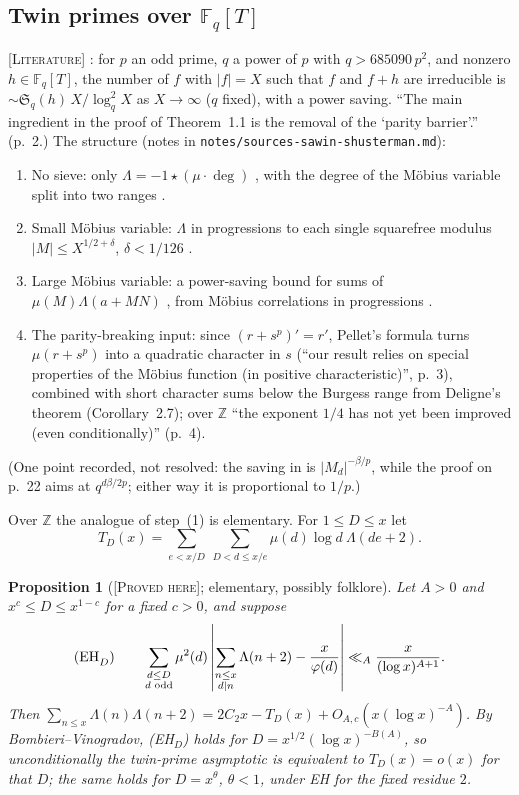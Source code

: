 \documentclass[11pt]{amsart}
\newtheorem{proposition}[theorem]{Proposition}
\theoremstyle{definition}
\theoremstyle{remark}
\newcommand{\lbl}[1]{\textup{\textsc{[#1]}}}
\begin{document}
\subsection{Twin primes over \texorpdfstring{$\mathbb F_q[T]$}{Fq[T]}}\label{sec:ss}
\lbl{Literature} \cite[Theorem~1.1, p.~2; Theorem~6.3, p.~30]{SS19}: for $p$ an
odd prime, $q$ a power of $p$ with $q>685090\,p^2$, and nonzero
$h\in\mathbb F_q[T]$, the number of $f$ with $|f|=X$ such that $f$ and $f+h$ are
irreducible is $\sim\mathfrak S_q(h)\,X/\log_q^2X$ as $X\to\infty$ ($q$ fixed),
with a power saving. ``The main ingredient in the proof of Theorem~1.1 is the
removal of the `parity barrier'.'' (p.~2.) The structure (notes in
\texttt{notes/}\allowbreak\texttt{sources-sawin-shusterman.md}):
\begin{enumerate}
\item No sieve: only $\Lambda=-1\star(\mu\cdot\deg)$ \cite[(5.7)]{SS19}, with the
  degree of the M\"obius variable split into two ranges
  \cite[(6.19)--(6.26)]{SS19}.
\item Small M\"obius variable: $\Lambda$ in progressions to each single
  squarefree modulus $|M|\le X^{1/2+\delta}$, $\delta<1/126$ \cite[Theorem~1.9]{SS19}.
\item Large M\"obius variable: a power-saving bound for sums of
  $\mu(M)\Lambda(a+MN)$ \cite[Corollary~6.1]{SS19}, from M\"obius correlations in
  progressions \cite[Theorem~4.5]{SS19}.
\item The parity-breaking input: since $(r+s^p)'=r'$, Pellet's formula turns
  $\mu(r+s^p)$ into a quadratic character in $s$ \cite[Lemma~3.2, p.~15]{SS19}
  (``our result relies on special properties of the M\"obius function (in
  positive characteristic)'', p.~3), combined with short character sums
  below the Burgess range from Deligne's theorem (Corollary~2.7); over
  $\mathbb Z$ ``the exponent $1/4$ has not yet been improved (even
  conditionally)'' (p.~4).
\end{enumerate}
(One point recorded, not resolved: the saving in \cite[(4.35)]{SS19} is
$|M_d|^{-\beta/p}$, while the proof on p.~22 aims at $q^{d\beta/2p}$; either way
it is proportional to $1/p$.)

Over $\mathbb Z$ the analogue of step~(1) is elementary. For $1\le D\le x$ let
\[T_D(x)=\sum_{e<x/D}\ \sum_{D<d\le x/e}\mu(d)\log d\ \Lambda(de+2).\]

\begin{proposition}[\lbl{Proved here}; elementary, possibly folklore]\label{prop:ss-split}
Let $A>0$ and $x^{c}\le D\le x^{1-c}$ for a fixed $c>0$, and suppose
\[
\textup{(EH}_D\textup{)}\qquad
\sum_{\substack{d\le D\\ d\text{ odd}}}\mu^2(d)\left|\sum_{\substack{n\le x\\ d\mid n}}\Lambda(n+2)-\frac{x}{\varphi(d)}\right|\ll_A\frac{x}{(\log x)^{A+1}}.
\]
Then $\sum_{n\le x}\Lambda(n)\Lambda(n+2)=2C_2x-T_D(x)+O_{A,c}(x(\log x)^{-A})$.
By Bombieri--Vinogradov, (EH$_D$) holds for $D=x^{1/2}(\log x)^{-B(A)}$, so
unconditionally the twin-prime asymptotic is equivalent to $T_D(x)=o(x)$ for
that $D$; the same holds for $D=x^{\theta}$, $\theta<1$, under EH for the fixed
residue $2$.
\end{proposition}
\end{document}
